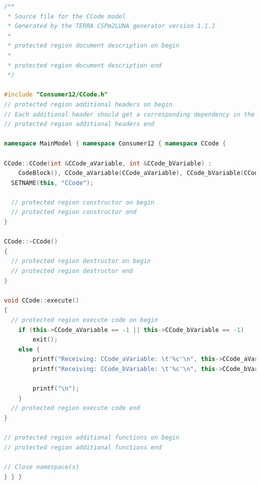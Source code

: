 \documentclass[a4paper,twoside,11pt]{article}
\begin{document}
\begin{lstlisting}[caption=Consumer12/CCode.cpp, label=code:1_2consumer, language=C++]
/**
 * Source file for the CCode model
 * Generated by the TERRA CSPm2LUNA generator version 1.1.1
 *
 * protected region document description on begin
 *
 * protected region document description end
 */

#include "Consumer12/CCode.h"
// protected region additional headers on begin
// Each additional header should get a corresponding dependency in the Makefile
// protected region additional headers end

namespace MainModel { namespace Consumer12 { namespace CCode { 

CCode::CCode(int &CCode_aVariable, int &CCode_bVariable) :
    CodeBlock(), CCode_aVariable(CCode_aVariable), CCode_bVariable(CCode_bVariable){
  SETNAME(this, "CCode");

  // protected region constructor on begin
  // protected region constructor end
}

CCode::~CCode()
{
  // protected region destructor on begin
  // protected region destructor end
}

void CCode::execute()
{
  // protected region execute code on begin
	if (this->CCode_aVariable == -1 || this->CCode_bVariable == -1)
		exit();
	else {
		printf("Receiving: CCode_aVariable: \t'%c'\n", this->CCode_aVariable);
		printf("Receiving: CCode_bVariable: \t'%c'\n", this->CCode_bVariable);

		printf("\n");
	}
  // protected region execute code end
}

// protected region additional functions on begin
// protected region additional functions end

// Close namespace(s)
} } } 
\end{lstlisting}
\end{document}
